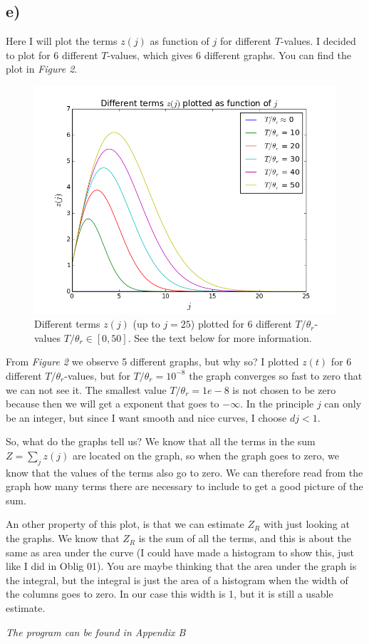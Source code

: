 \documentclass{scrartcl}
\begin{document}
\subsection*{e)}
Here I will plot the terms $z(j)$ as function of $j$ for different $T$-values. I decided to plot for 6 different $T$-values, which gives 6 different graphs. You can find the plot in \textit{Figure 2}.\par\vspace{3mm}
\begin{figure}[!htbp]
\centering
\includegraphics[width=120mm]{oblig2_2.png}
\caption{Different terms $z(j)$ (up to $j=25$) plotted for 6 different $T/\theta_r$-values $T/\theta_r\in [0,50]$. See the text below for more information. \label{overflow}}
\end{figure}
From \textit{Figure 2} we observe 5 different graphs, but why so? I plotted $z(t)$ for 6 different $T/\theta_r$-values, but for $T/\theta_r=10^{-8}$ the graph converges so fast to zero that we can not see it. The smallest value $T/\theta_r=1e-8$ is not chosen to be zero because then we will get a exponent that goes to $-\infty$. In the principle $j$ can only be an integer, but since I want smooth and nice curves, I choose $dj<1$. \par\vspace{3mm}
So, what do the graphs tell us? We know that all the terms in the sum $Z=\sum_jz(j)$ are located on the graph, so when the graph goes to zero, we know that the values of the terms also go to zero. We can therefore read from the graph how many terms there are necessary to include to get a good picture of the sum. \par\vspace{3mm}
An other property of this plot, is that we can estimate $Z_R$ with just looking at the graphs. We know that $Z_R$ is the sum of all the terms, and this is about the same as area under the curve (I could have made a histogram to show this, just like I did in Oblig 01). You are maybe thinking that the area under the graph is the integral, but the integral is just the area of a histogram when the width of the columns goes to zero. In our case this width is 1, but it is still a usable estimate. \par\vspace{3mm}
\textit{The program can be found in Appendix B}
\end{document}
